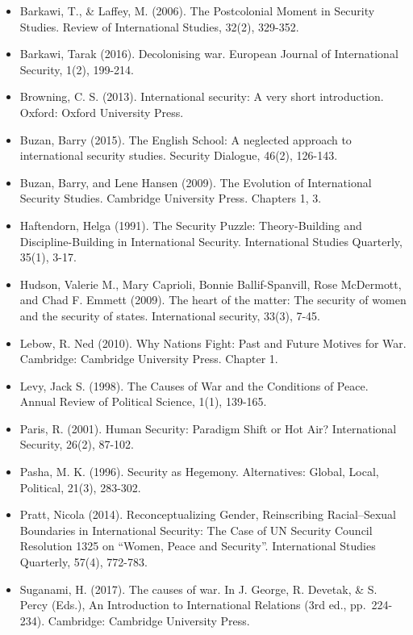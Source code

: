 \documentclass[
  letterpaper,
  DIV=11,
  numbers=noendperiod]{scrartcl}
\providecommand{\tightlist}{%
  \setlength{\itemsep}{0pt}\setlength{\parskip}{0pt}}\usepackage{longtable,booktabs,array}
\begin{document}
\begin{itemize}
\tightlist
\item
  Barkawi, T., \& Laffey, M. (2006). The Postcolonial Moment in Security
  Studies. Review of International Studies, 32(2), 329-352.
\item
  Barkawi, Tarak (2016). Decolonising war. European Journal of
  International Security, 1(2), 199-214.
\item
  Browning, C. S. (2013). International security: A very short
  introduction. Oxford: Oxford University Press.
\item
  Buzan, Barry (2015). The English School: A neglected approach to
  international security studies. Security Dialogue, 46(2), 126-143.
\item
  Buzan, Barry, and Lene Hansen (2009). The Evolution of International
  Security Studies. Cambridge University Press. Chapters 1, 3.
\item
  Haftendorn, Helga (1991). The Security Puzzle: Theory-Building and
  Discipline-Building in International Security. International Studies
  Quarterly, 35(1), 3-17.
\item
  Hudson, Valerie M., Mary Caprioli, Bonnie Ballif-Spanvill, Rose
  McDermott, and Chad F. Emmett (2009). The heart of the matter: The
  security of women and the security of states. International security,
  33(3), 7-45.
\item
  Lebow, R. Ned (2010). Why Nations Fight: Past and Future Motives for
  War. Cambridge: Cambridge University Press. Chapter 1.
\item
  Levy, Jack S. (1998). The Causes of War and the Conditions of Peace.
  Annual Review of Political Science, 1(1), 139-165.
\item
  Paris, R. (2001). Human Security: Paradigm Shift or Hot Air?
  International Security, 26(2), 87-102.
\item
  Pasha, M. K. (1996). Security as Hegemony. Alternatives: Global,
  Local, Political, 21(3), 283-302.
\item
  Pratt, Nicola (2014). Reconceptualizing Gender, Reinscribing
  Racial--Sexual Boundaries in International Security: The Case of UN
  Security Council Resolution 1325 on ``Women, Peace and Security''.
  International Studies Quarterly, 57(4), 772-783.
\item
  Suganami, H. (2017). The causes of war. In J. George, R. Devetak, \&
  S. Percy (Eds.), An Introduction to International Relations (3rd ed.,
  pp.~224-234). Cambridge: Cambridge University Press.
\end{itemize}
\end{document}
